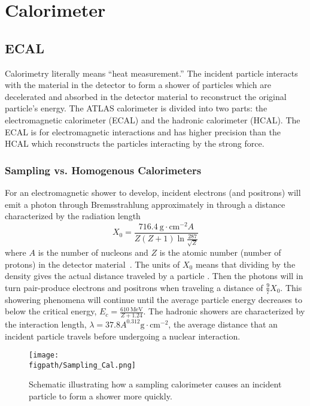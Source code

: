 \section{Calorimeter}

\subsection{ECAL}

Calorimetry literally means ``heat measurement.'' The incident particle interacts with the material in the detector to form a shower of particles which are decelerated and absorbed in the detector material to reconstruct the original particle's energy.  
The ATLAS calorimeter is divided into two parts: the electromagnetic calorimeter (ECAL) and the hadronic calorimeter (HCAL).  The ECAL is for electromagnetic interactions and has higher precision than the HCAL which reconstructs the particles interacting by the strong force.   

\subsubsection{Sampling vs. Homogenous Calorimeters}

For an electromagnetic shower to develop, incident electrons (and positrons) will emit a photon through Bremsstrahlung approximately in through a distance characterized by the radiation length
\begin{equation}
X_0=\frac{716.4~{\text{g}} \cdot {\text{cm}}^{-2}  A}{Z(Z+1) \ln{ \frac{ 287 }{ \sqrt{Z} }}}
\label{radiation_length}
\end{equation}
where $A$ is the number of nucleons and $Z$ is the atomic number (number of protons) in the detector material~\cite{Calorimetry1}.
The units of $X_0$ means that dividing by the density gives the actual distance traveled by a particle \cite{Calorimetry2}.
Then the photons will in turn pair-produce electrons and positrons when traveling a distance of $\frac{9}{7} X_0$.  This showering phenomena will continue until the average particle energy decreases to below the critical energy, $E_c=\frac{610~{\text{MeV}}}{Z+1.24}$.
The hadronic showers are characterized by the interaction length, $\lambda = 37.8 A^{0.312} {\text{g}} \cdot {\text{cm}}^{-2}$, the average distance that an incident particle travels before undergoing a nuclear interaction.  

\begin{wrapfigure}{r}{0.5\textwidth}
\centering
\texttt{[image: \\figpath/Sampling\_Cal.png]}
\caption{Schematic illustrating how a sampling calorimeter causes an incident particle to form a shower more quickly.
~\cite{Sampling_Cal}}
\label{sampling-schematic}
\end{wrapfigure}

